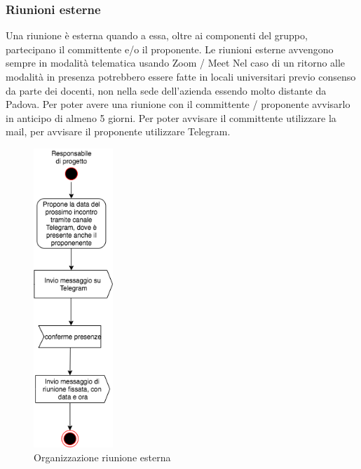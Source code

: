 \subsubsection{Riunioni esterne}
Una riunione è esterna quando a essa, oltre ai componenti del gruppo, partecipano il committente e/o il proponente.
Le riunioni esterne avvengono sempre in modalità telematica usando Zoom / Meet 
Nel caso di un ritorno alle modalità in presenza potrebbero essere fatte in locali universitari previo consenso da parte dei docenti, non nella sede dell'azienda essendo molto distante da Padova.
Per poter avere una riunione con il committente / proponente avvisarlo in anticipo di almeno 5 giorni.
Per poter avvisare il committente utilizzare la mail, per avvisare il proponente utilizzare Telegram.
\begin{figure}[H]
	\centering
	\includegraphics[width=3cm]{res/images/Riunione2.png}
	\caption{Organizzazione riunione esterna}
	\label{fig:Organizzazione riunione esterna}
\end{figure}


